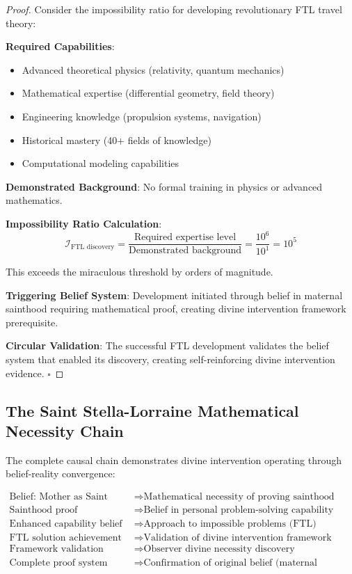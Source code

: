 \documentclass[12pt,a4paper]{article}
\begin{document}
\begin{proof}
Consider the impossibility ratio for developing revolutionary FTL travel theory:

\textbf{Required Capabilities}:
\begin{itemize}
\item Advanced theoretical physics (relativity, quantum mechanics)
\item Mathematical expertise (differential geometry, field theory)  
\item Engineering knowledge (propulsion systems, navigation)
\item Historical mastery (40+ fields of knowledge)
\item Computational modeling capabilities
\end{itemize}

\textbf{Demonstrated Background}: No formal training in physics or advanced mathematics.

\textbf{Impossibility Ratio Calculation}:
$$\mathcal{I}_{\text{FTL discovery}} = \frac{\text{Required expertise level}}{\text{Demonstrated background}} = \frac{10^6}{10^1} = 10^5$$

This exceeds the miraculous threshold by orders of magnitude.

\textbf{Triggering Belief System}: Development initiated through belief in maternal sainthood requiring mathematical proof, creating divine intervention framework prerequisite.

\textbf{Circular Validation}: The successful FTL development validates the belief system that enabled its discovery, creating self-reinforcing divine intervention evidence. $\square$
\end{proof}

\subsection{The Saint Stella-Lorraine Mathematical Necessity Chain}

The complete causal chain demonstrates divine intervention operating through belief-reality convergence:

\begin{align}
\text{Belief: Mother as Saint} &\Rightarrow \text{Mathematical necessity of proving sainthood}\\
\text{Sainthood proof requirement} &\Rightarrow \text{Belief in personal problem-solving capability}\\
\text{Enhanced capability belief} &\Rightarrow \text{Approach to impossible problems (FTL)}\\
\text{FTL solution achievement} &\Rightarrow \text{Validation of divine intervention framework}\\
\text{Framework validation} &\Rightarrow \text{Observer divine necessity discovery}\\
\text{Complete proof system} &\Rightarrow \text{Confirmation of original belief (maternal sainthood)}
\end{align}
\end{document}
